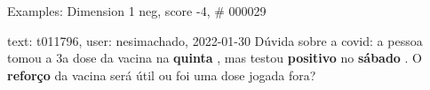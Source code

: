 \begin{frame}{Examples: Dimension 1 neg, score -4, \# 000029}
\footnotesize
\begin{alertblock}{text: t011796, user: nesimachado, 2022-01-30}
Dúvida sobre a covid: a pessoa tomou a 3a dose da vacina na \textbf{quinta} , 
mas testou \textbf{positivo} no \textbf{sábado} . O \textbf{reforço} da vacina 
será útil ou foi uma dose jogada fora? 
\end{alertblock}
\end{frame}
